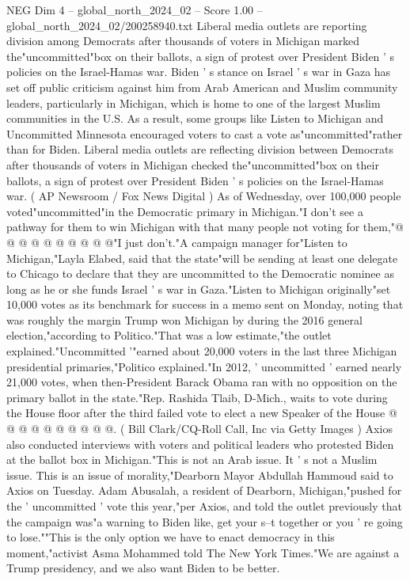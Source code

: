 \begin{textsample}{NEG Dim 4 – global\_north\_2024\_02 – Score 1.00 – global\_north\_2024\_02/200258940.txt}  \label{ex:f4_neg_272}
Liberal media outlets are reporting division among Democrats after thousands of voters in Michigan marked the"uncommitted"box on their ballots, a sign of protest over President Biden ' s policies on the Israel-Hamas war.
Biden ' s stance on Israel ' s war in Gaza has set off public criticism against him from Arab American and Muslim community leaders, particularly in Michigan, which is home to one of the largest Muslim communities in the U.S.
As a result, some groups like Listen to Michigan and Uncommitted Minnesota encouraged voters to cast a vote as"uncommitted"rather than for Biden.
Liberal media outlets are reflecting division between Democrats after thousands of voters in Michigan checked the"uncommitted"box on their ballots, a sign of protest over President Biden ' s policies on the Israel-Hamas war. ( AP Newsroom / Fox News Digital ) As of Wednesday, over 100,000 people voted"uncommitted"in the Democratic primary in Michigan."I don't see a pathway for them to win Michigan with that many people not voting for them,"@ @ @ @ @ @ @ @ @ @"I just don't."A campaign manager for"Listen to Michigan,"Layla Elabed, said that the state"will be sending at least one delegate to Chicago to declare that they are uncommitted to the Democratic nominee as long as he or she funds Israel ' s war in Gaza."Listen to Michigan originally"set 10,000 votes as its benchmark for success in a memo sent on Monday, noting that was roughly the margin Trump won Michigan by during the 2016 general election,"according to Politico."That was a low estimate,"the outlet explained."Uncommitted '"earned about 20,000 voters in the last three Michigan presidential primaries,"Politico explained."In 2012, ' uncommitted ' earned nearly 21,000 votes, when then-President Barack Obama ran with no opposition on the primary ballot in the state."Rep.
Rashida Tlaib, D-Mich., waits to vote during the House floor after the third failed vote to elect a new Speaker of the House @ @ @ @ @ @ @ @ @ @. ( Bill Clark/CQ-Roll Call, Inc via Getty Images ) Axios also conducted interviews with voters and political leaders who protested Biden at the ballot box in Michigan."This is not an Arab issue.
It ' s not a Muslim issue.
This is an issue of morality,"Dearborn Mayor Abdullah Hammoud said to Axios on Tuesday.
Adam Abusalah, a resident of Dearborn, Michigan,"pushed for the ' uncommitted ' vote this year,"per Axios, and told the outlet previously that the campaign was"a warning to Biden like, get your s--t together or you ' re going to lose.""This is the only option we have to enact democracy in this moment,"activist Asma Mohammed told The New York Times."We are against a Trump presidency, and we also want Biden to be better.

\end{textsample}
